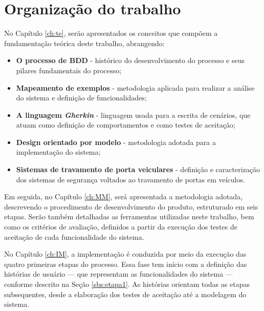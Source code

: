 
\section{\textbf{Organização do trabalho}}
No Capítulo \ref{ch:te}, serão apresentados os conceitos que compõem a fundamentação teórica deste trabalho, abrangendo:

\begin{itemize}
    \item \textbf{O processo de BDD} - histórico do desenvolvimento do processo e seus pilares fundamentais do processo;
    \item \textbf{Mapeamento de exemplos} - metodologia aplicada para realizar a análise do sistema e definição de funcionalidades;
    \item \textbf{A linguagem \textit{Gherkin}} - linguagem usada para a escrita de cenários, que atuam como definição de comportamentos e como testes de aceitação;
    \item \textbf{Design orientado por modelo} - metodologia adotada para a implementação do sistema;
    \item \textbf{Sistemas de travamento de porta veiculares} - definição e caracterização dos sistemas de segurança voltados ao travamento de portas em veículos. 
\end{itemize}

Em seguida, no Capítulo \ref{ch:MM}, será apresentada a metodologia adotada, descrevendo o procedimento de desenvolvimento do produto, estruturado em seis etapas. 
Serão também detalhadas as ferramentas utilizadas neste trabalho, bem como os critérios de avaliação, definidos a partir da execução dos testes de aceitação de 
cada funcionalidade do sistema.

No Capítulo \ref{ch:IM}, a implementação é conduzida por meio da execução das quatro primeiras etapas do processo. Essa fase tem início com a definição das histórias 
de usuário — que representam as funcionalidades do sistema — conforme descrito na Seção \ref{sbs:etapa1}. As histórias orientam todas as etapas subsequentes, desde a 
elaboração dos testes de aceitação até a modelagem do sistema.

